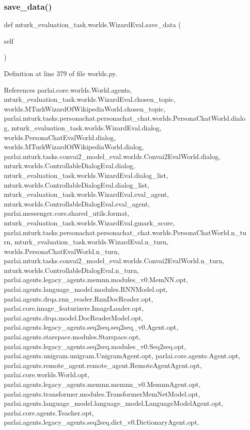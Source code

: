 \subsubsection{\texorpdfstring{save\+\_\+data()}{save\_data()}}
{\footnotesize\ttfamily def mturk\+\_\+evaluation\+\_\+task.\+worlds.\+Wizard\+Eval.\+save\+\_\+data (\begin{DoxyParamCaption}\item[{}]{self }\end{DoxyParamCaption})}



Definition at line 379 of file worlds.\+py.



References parlai.\+core.\+worlds.\+World.\+agents, mturk\+\_\+evaluation\+\_\+task.\+worlds.\+Wizard\+Eval.\+chosen\+\_\+topic, worlds.\+M\+Turk\+Wizard\+Of\+Wikipedia\+World.\+chosen\+\_\+topic, parlai.\+mturk.\+tasks.\+personachat.\+personachat\+\_\+chat.\+worlds.\+Persona\+Chat\+World.\+dialog, mturk\+\_\+evaluation\+\_\+task.\+worlds.\+Wizard\+Eval.\+dialog, worlds.\+Persona\+Chat\+Eval\+World.\+dialog, worlds.\+M\+Turk\+Wizard\+Of\+Wikipedia\+World.\+dialog, parlai.\+mturk.\+tasks.\+convai2\+\_\+model\+\_\+eval.\+worlds.\+Convai2\+Eval\+World.\+dialog, mturk.\+worlds.\+Controllable\+Dialog\+Eval.\+dialog, mturk\+\_\+evaluation\+\_\+task.\+worlds.\+Wizard\+Eval.\+dialog\+\_\+list, mturk.\+worlds.\+Controllable\+Dialog\+Eval.\+dialog\+\_\+list, mturk\+\_\+evaluation\+\_\+task.\+worlds.\+Wizard\+Eval.\+eval\+\_\+agent, mturk.\+worlds.\+Controllable\+Dialog\+Eval.\+eval\+\_\+agent, parlai.\+messenger.\+core.\+shared\+\_\+utils.\+format, mturk\+\_\+evaluation\+\_\+task.\+worlds.\+Wizard\+Eval.\+gmark\+\_\+score, parlai.\+mturk.\+tasks.\+personachat.\+personachat\+\_\+chat.\+worlds.\+Persona\+Chat\+World.\+n\+\_\+turn, mturk\+\_\+evaluation\+\_\+task.\+worlds.\+Wizard\+Eval.\+n\+\_\+turn, worlds.\+Persona\+Chat\+Eval\+World.\+n\+\_\+turn, parlai.\+mturk.\+tasks.\+convai2\+\_\+model\+\_\+eval.\+worlds.\+Convai2\+Eval\+World.\+n\+\_\+turn, mturk.\+worlds.\+Controllable\+Dialog\+Eval.\+n\+\_\+turn, parlai.\+agents.\+legacy\+\_\+agents.\+memnn.\+modules\+\_\+v0.\+Mem\+N\+N.\+opt, parlai.\+agents.\+language\+\_\+model.\+modules.\+R\+N\+N\+Model.\+opt, parlai.\+agents.\+drqa.\+rnn\+\_\+reader.\+Rnn\+Doc\+Reader.\+opt, parlai.\+core.\+image\+\_\+featurizers.\+Image\+Loader.\+opt, parlai.\+agents.\+drqa.\+model.\+Doc\+Reader\+Model.\+opt, parlai.\+agents.\+legacy\+\_\+agents.\+seq2seq.\+seq2seq\+\_\+v0.\+Agent.\+opt, parlai.\+agents.\+starspace.\+modules.\+Starspace.\+opt, parlai.\+agents.\+legacy\+\_\+agents.\+seq2seq.\+modules\+\_\+v0.\+Seq2seq.\+opt, parlai.\+agents.\+unigram.\+unigram.\+Unigram\+Agent.\+opt, parlai.\+core.\+agents.\+Agent.\+opt, parlai.\+agents.\+remote\+\_\+agent.\+remote\+\_\+agent.\+Remote\+Agent\+Agent.\+opt, parlai.\+core.\+worlds.\+World.\+opt, parlai.\+agents.\+legacy\+\_\+agents.\+memnn.\+memnn\+\_\+v0.\+Memnn\+Agent.\+opt, parlai.\+agents.\+transformer.\+modules.\+Transformer\+Mem\+Net\+Model.\+opt, parlai.\+agents.\+language\+\_\+model.\+language\+\_\+model.\+Language\+Model\+Agent.\+opt, parlai.\+core.\+agents.\+Teacher.\+opt, parlai.\+agents.\+legacy\+\_\+agents.\+seq2seq.\+dict\+\_\+v0.\+Dictionary\+Agent.\+opt, 